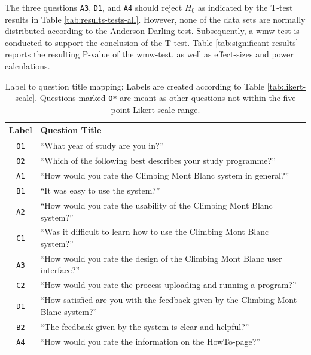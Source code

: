 The three questions \texttt{A3}, \texttt{D1}, and \texttt{A4} should reject $H_0$ as indicated by the T-test results in Table \ref{tab:results-tests-all}. However, none of the data sets are normally distributed according to the Anderson-Darling test. Subsequently, a \gls{wmw}-test is conducted to support the conclusion of the T-test. Table \ref{tab:significant-results} reports the resulting P-value of the \gls{wmw}-test, as well as effect-sizes and power calculations. \\

\begin{table}[t!]
    \centering
    \begin{tabular}{ | c | p{9cm} |}
    \hline
    \textbf{Label} & \textbf{Question Title} \\ \hline
    \texttt{O1} & ``What year of study are you in?'' \\ \hline
    \texttt{O2} & ``Which of the following best describes your study programme?''  \\ \hline
    \texttt{A1} & ``How would you rate the Climbing Mont Blanc system in general?'' \\ \hline
    \texttt{B1} & ``It was easy to use the system?'' \\ \hline
    \texttt{A2} & ``How would you rate the usability of the Climbing Mont Blanc system?'' \\ \hline
    \texttt{C1} & ``Was it difficult to learn how to use the Climbing Mont Blanc system?'' \\ \hline
    \texttt{A3} & ``How would you rate the design of the Climbing Mont Blanc user interface?'' \\ \hline
    \texttt{C2} & ``How would you rate the process uploading and running a program?'' \\ \hline
    \texttt{D1} & ``How satisfied are you with the feedback given by the Climbing Mont Blanc system?'' \\ \hline
    \texttt{B2} & ``The feedback given by the system is clear and helpful?'' \\ \hline
    \texttt{A4} & ``How would you rate the information on the HowTo-page?'' \\ \hline
    \end{tabular}
    \caption[Label to question title mapping]{Label to question title mapping: Labels are created according to Table \ref{tab:likert-scale}. Questions marked \texttt{O*} are meant as other questions not within the five point Likert scale range.}
    \label{tab:label-to-title}
\end{table}

